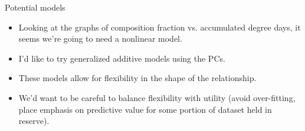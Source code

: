 \documentclass{beamer}
\begin{document}
\begin{frame}{Potential models}
  
  \begin{itemize}
    \item Looking at the graphs of composition fraction vs. accumulated degree days, it seems we're going to need a nonlinear model.
\item I'd like to try generalized additive models using the PCs.
\item These models allow for flexibility in the shape of the relationship.
  \item We'd want to be careful to balance flexibility with utility (avoid over-fitting, place emphasis on predictive value for some portion of dataset held in reserve).
\end{itemize}

\end{frame}
\end{document}
